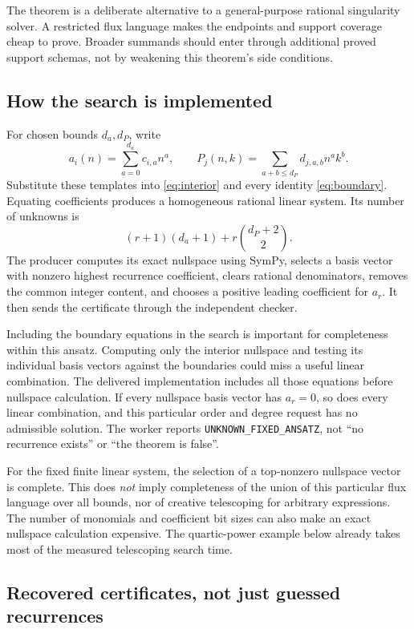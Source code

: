 The theorem is a deliberate alternative to a general-purpose rational
singularity solver. A restricted flux language makes the endpoints and support
coverage cheap to prove. Broader summands should enter through additional
proved support schemas, not by weakening this theorem's side conditions.

\subsection{How the search is implemented}

For chosen bounds $d_a,d_P$, write
\[
a_i(n)=\sum_{a=0}^{d_a}c_{i,a}n^a,\qquad
P_j(n,k)=\sum_{a+b\le d_P}d_{j,a,b}n^ak^b.
\]
Substitute these templates into \eqref{eq:interior} and every identity
\eqref{eq:boundary}. Equating coefficients produces a homogeneous rational
linear system. Its number of unknowns is
\begin{equation}\label{eq:ansatz-size}
(r+1)(d_a+1)+r\binom{d_P+2}{2}.
\end{equation}
The producer computes its exact nullspace using SymPy, selects a basis vector
with nonzero highest recurrence coefficient, clears rational denominators,
removes the common integer content, and chooses a positive leading coefficient
for $a_r$. It then sends the certificate through the independent checker.

Including the boundary equations in the search is important for completeness
within this ansatz. Computing only the interior nullspace and testing its
individual basis vectors against the boundaries could miss a useful linear
combination. The delivered implementation includes all those equations before
nullspace calculation. If every nullspace basis vector has $a_r=0$, so does
every linear combination, and this particular order and degree request has no
admissible solution. The worker reports \texttt{UNKNOWN\_FIXED\_ANSATZ}, not
``no recurrence exists'' or ``the theorem is false''.

For the fixed finite linear system, the selection of a top-nonzero nullspace
vector is complete. This does \emph{not} imply completeness of the union of
this particular flux language over all bounds, nor of creative telescoping
for arbitrary expressions. The number of monomials and coefficient bit sizes
can also make an exact nullspace calculation expensive. The quartic-power
example below already takes most of the measured telescoping search time.

\subsection{Recovered certificates, not just guessed recurrences}

